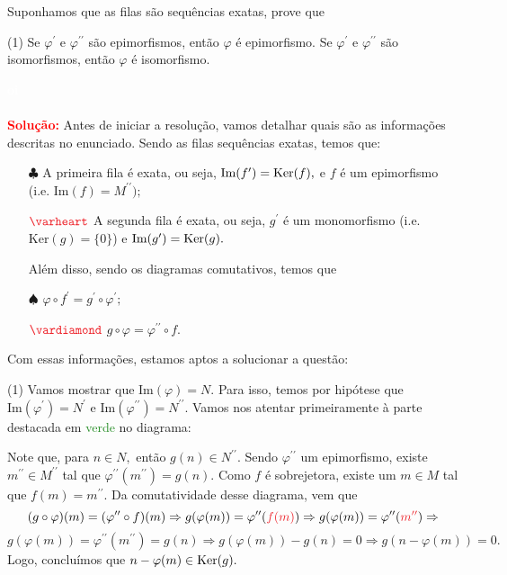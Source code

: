 \documentclass[11pt,a4paper]{article}
\newcommand{\dividiritens}[1]{\begin{tasks}[counter-format={(tsk[a])},label-width=3.6ex, label-format = {\bfseries}, column-sep = {0pt}](1) #1 \end{tasks}}
\newcommand{\pers}[1]{\textcolor{Floresta}{$\negrito{(#1)} $}}
\newcommand{\solucao}[1]{
\textbf{\textcolor{white}{oi}\\ \\ \textcolor{red}{Solução:}} #1}
\begin{document}
Suponhamos que as filas são sequências exatas, prove que
\dividiritens{
\task[\pers{a}] Se $\varphi^\prime$ e $\varphi^{\prime \prime}$ são epimorfismos, então $\varphi$ é epimorfismo.
\task[\pers{b}] Se $\varphi^\prime$ e $\varphi^{\prime \prime}$ são isomorfismos, então $\varphi$ é isomorfismo.
}
\solucao{
Antes de iniciar a resolução, vamos detalhar quais são as informações descritas no enunciado. Sendo as filas sequências exatas, temos que:
\begin{itemize}
    \item[$\clubsuit$] A primeira fila é exata, ou seja, $\mbox{Im}(f^{\prime}) = {\rm Ker}(f),$ e $f$ é um epimorfismo (i.e. $\mbox{Im}(f) = M^{\prime \prime});$
    \item[$\textcolor{Red}{\varheart}$] A segunda fila é exata, ou seja, $g^{\prime}$ é um monomorfismo (i.e. $\mbox{Ker}(g) = \{ 0 \}$) e $\mbox{Im}(g^{\prime}) = {\rm Ker}(g).$
    
Além disso, sendo os diagramas comutativos, temos que
    \item[$\spadesuit$] $\varphi \circ f^{\prime}= g^{\prime} \circ \varphi^{\prime};$
    \item[$\textcolor{Red}{\vardiamond}$] $g \circ \varphi = \varphi^{\prime \prime} \circ f.$
\end{itemize}

Com essas informações, estamos aptos a solucionar a questão:
\dividiritens{
\task[\pers{a}] Vamos mostrar que $\mbox{Im}(\varphi) = N.$ Para isso, temos por hipótese que $\mbox{Im}(\varphi^{\prime}) = N^{\prime}$ e $\mbox{Im}(\varphi^{\prime \prime}) = N^{\prime \prime}.$
Vamos nos atentar primeiramente à parte destacada em \textcolor{ForestGreen}{verde} no diagrama:
}
}
\begin{center}
\end{center}
Note que, para $n \in N,$ então $g(n) \in N^{\prime \prime}.$ Sendo $\varphi^{\prime \prime}$ um epimorfismo, existe $m^{\prime \prime} \in M^{\prime \prime}$ tal que $\varphi^{\prime \prime} (m^{\prime \prime}) = g(n).$ Como $f$ é sobrejetora, existe um $m \in M$ tal que $f(m) = m^{\prime \prime}.$ Da comutatividade desse diagrama, vem que
\[
(g \circ \varphi)(m) = (\varphi^{\prime \prime} \circ f)(m) \Rightarrow g(\varphi(m)) = \varphi^{\prime \prime}(\textcolor{Red}{f(m)}) \Rightarrow g(\varphi(m)) = \varphi^{\prime \prime}(\textcolor{Red}{m^{\prime \prime}})  \Rightarrow \]\[g(\varphi(m)) = \varphi^{\prime \prime}(m^{\prime \prime}) = g(n) \Rightarrow g(\varphi(m)) - g(n) = 0 \Rightarrow g(n - \varphi(m)) = 0.
\]
Logo, concluímos que $n - \varphi(m) \in {\rm Ker}(g).$
\end{document}
